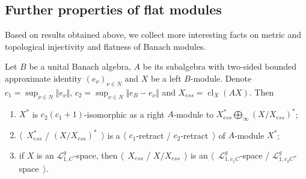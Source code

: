 
\subsection{
    Further properties of flat modules
}\label{SubSectionFurtherPropertiesOfFlatModules}

Based on results obtained above, we collect more interesting facts on metric and
topological injectivity and flatness of Banach modules.

\begin{proposition}\label{DualBanModDecomp} Let $B$ be a unital Banach algebra,
$A$ be its subalgebra with two-sided bounded approximate identity
${(e_\nu)}_{\nu\in N}$ and $X$ be a left $B$-module. 
Denote $c_1=\sup_{\nu\in N}\Vert e_\nu\Vert$, 
$c_2=\sup_{\nu\in N}\Vert e_B-e_\nu\Vert$ and $X_{ess}=\operatorname{cl}_X(AX)$.
Then 

\begin{enumerate}[label = (\roman*)]
    \item $X^*$ is $c_2(c_1+1)$-isomorphic as a right $A$-module to
    $X_{ess}^*\bigoplus_\infty {(X/X_{ess})}^*$;

    \item $\langle$~$X_{ess}^*$ / ${(X/X_{ess})}^*$~$\rangle$ is a $\langle$
    $c_1$-retract / $c_2$-retract~$\rangle$ of $A$-module $X^*$;

    \item if $X$ is an $\mathscr{L}_{1,C}^g$-space, then $\langle$~$X_{ess}$ /
    $X/X_{ess}$~$\rangle$ is an $\langle$~$\mathscr{L}_{1,c_1C}^g$-space /
    $\mathscr{L}_{1,c_2C}^g$-space~$\rangle$.
\end{enumerate}

\end{proposition}
